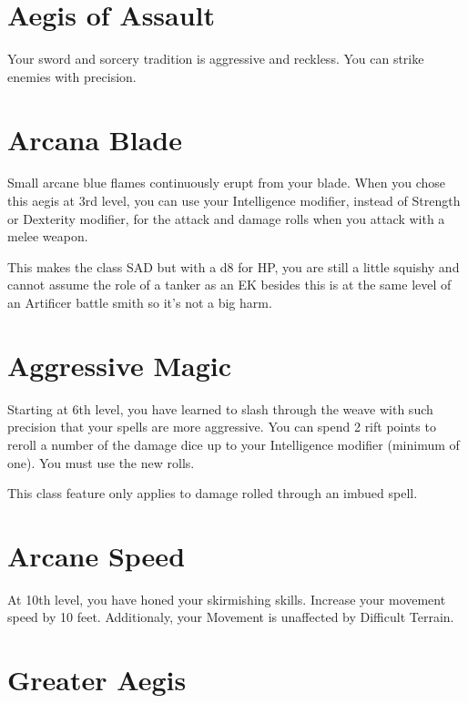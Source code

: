 \begin{multicols*}{2}


\section*{Aegis of Assault}

Your sword and sorcery tradition is aggressive and reckless. You can strike enemies with precision.  

\section*{Arcana Blade}

Small arcane blue flames continuously erupt from your blade. When you chose this aegis at 3rd level, you can use your Intelligence modifier, instead of Strength or Dexterity modifier, for the attack and damage rolls when you attack with a melee weapon.



\smallskip

{\color{red} This makes the class SAD but with a d8 for HP, you are still a little squishy and cannot assume the role of a tanker as an EK besides this is at the same level of an Artificer battle smith so it's not a big harm. }



\section*{Aggressive Magic}

Starting at 6th level, you have learned to slash through the weave with such precision that your spells are more aggressive. You can spend 2 rift points to reroll a number of the damage dice up to your Intelligence modifier (minimum of one). You must use the new rolls. 

This class feature only applies to damage rolled through an imbued spell.


\section*{Arcane Speed}

At 10th level, you have honed your skirmishing skills. Increase your movement speed by 10 feet. Additionaly, your Movement is unaffected by Difficult Terrain.


\section*{Greater Aegis}


\end{multicols*}
